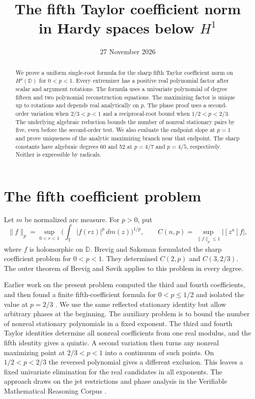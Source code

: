\documentclass[11pt]{article}
\title{The fifth Taylor coefficient norm\\in Hardy spaces below \texorpdfstring{\(H^1\)}{H1}}
\author{}
\date{27 November 2026}
\newcommand{\D}{\mathbb D}
\newcommand{\T}{\mathbb T}
\begin{document}
\maketitle

\begin{abstract}
We prove a uniform single-root formula for the sharp fifth Taylor
coefficient norm on \(H^p(\mathbb D)\) for \(0<p<1\).
Every extremizer has a positive real polynomial factor after scalar and
argument rotations. The formula uses a univariate polynomial of
degree fifteen and two polynomial reconstruction equations. The
maximizing factor is unique up to rotations and depends real
analytically on \(p\). The phase proof uses a
second-order variation when \(2/3<p<1\) and a reciprocal-root
bound when \(1/2<p<2/3\). The underlying algebraic reduction
bounds the number of nonreal stationary pairs by five, even
before the second-order test. We also evaluate the endpoint slope
at \(p=1\) and prove uniqueness of the analytic maximizing branch
near that endpoint. The sharp constants have algebraic degrees
60 and 52 at \(p=4/7\) and \(p=4/5\), respectively. Neither is
expressible by radicals.
\end{abstract}

\section{The fifth coefficient problem}

Let \(m\) be normalized arc measure. For \(p>0\), put
\[
 \|f\|_p=\sup_{0<r<1}
       \bigg(\int_{\T}|f(rz)|^p\,dm(z)\bigg)^{1/p},\qquad
 C(n,p)=\sup_{\|f\|_p\leq1}|[z^n]f|,
\]
where \(f\) is holomorphic on \(\D\). Brevig and Saksman
\cite{BrevigSaksman} formulated the sharp coefficient problem for
\(0<p<1\). They determined \(C(2,p)\) and \(C(3,2/3)\).
The outer theorem of Brevig and S{\o}vik \cite{BrevigSovik}
applies to this problem in every degree.

Earlier work on the present problem computed the third and
fourth coefficients, and then found a finite fifth-coefficient
formula for \(0<p\leq1/2\) and isolated the value at \(p=2/3\)
\cite{Low,High}. We use the same reflected stationary identity
but allow arbitrary phases at the beginning. The auxiliary
problem is to bound the number of nonreal stationary polynomials
in a fixed exponent. The third and fourth Taylor identities
determine all nonreal coefficients from one real modulus, and
the fifth identity gives a quintic. A second variation then
turns any nonreal maximizing point at \(2/3<p<1\) into a
continuum of such points. On \(1/2<p<2/3\) the reversed
polynomial gives a different exclusion. This leaves a fixed
univariate elimination for the real candidates in all exponents.
The approach draws on the jet restrictions and phase analysis
in the Verifiable Mathematical Reasoning Corpus \cite{VMRC}.
\end{document}
